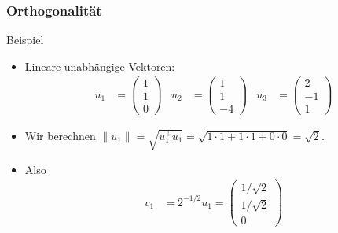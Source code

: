 \documentclass{beamer}
\newcommand{\trans}{\top}
\renewcommand{\ae}{\"a}
\newcommand{\mytitle}{Orthogonalit\ae t}
\begin{document}
\begin{frame}\frametitle{\mytitle}
	\begin{block}{Beispiel}
	\begin{itemize}
		\item Lineare unabh\ae ngige Vektoren:
\begin{align*}
	u_1&=\begin{pmatrix}1\\1\\0\end{pmatrix}&
	u_2&=\begin{pmatrix}1\\1\\-4\end{pmatrix}&
	u_3&=\begin{pmatrix} 2\\-1\\1 \end{pmatrix}
\end{align*}
\item Wir berechnen $\|u_1\|=\sqrt{u_1^\trans u_1}=\sqrt{1\cdot 1+1\cdot 1+0\cdot0}=\sqrt 2$.
\item Also 
	\begin{align*}
		v_1&=2^{-1/2}u_1=\begin{pmatrix}1/\sqrt 2\\1/\sqrt 2\\0\end{pmatrix}
	\end{align*}
\end{itemize}
	\end{block}
\end{frame}
\end{document}
